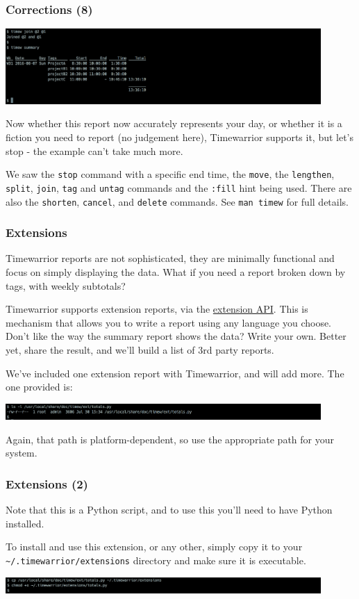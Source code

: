 \documentclass[t,handout]{beamer}
\begin{document}
\begin{frame}[fragile]\frametitle{Corrections (8)}
    \includegraphics[width=12cm]{images/tutorial43.png}

    Now whether this report now accurately represents your day, or whether it is a fiction you need to report (no judgement here), Timewarrior supports it, but let's stop - the example can't take much more.

    We saw the \verb=stop= command with a specific end time, the \verb=move=, the \verb=lengthen=, \verb=split=, \verb=join=, \verb=tag= and \verb=untag= commands and the \verb=:fill= hint being used. There are also the \verb=shorten=, \verb=cancel=, and \verb=delete= commands.  See \verb=man timew= for full details.
\end{frame}

\begin{frame}[fragile]\frametitle{Extensions}
    Timewarrior reports are not sophisticated, they are minimally functional and focus on simply displaying the data. What if you need a report broken down by tags, with weekly subtotals?

    Timewarrior supports extension reports, via the \href{https://taskwarrior.orgdocs/timewarrior/api.html}{extension API}. This is mechanism that allows you to write a report using any language you choose. Don't like the way the summary report shows the data? Write your own. Better yet, share the result, and we'll build a list of 3rd party reports.

    We've included one extension report with Timewarrior, and will add more. The one provided is:

    \includegraphics[width=12cm]{images/tutorial44.png}

    Again, that path is platform-dependent, so use the appropriate path for your system.
\end{frame}

\begin{frame}[fragile]\frametitle{Extensions (2)}
    Note that this is a Python script, and to use this you'll need to have Python installed.

    To install and use this extension, or any other, simply copy it to your \verb=~/.timewarrior/extensions= directory and make sure it is executable.

    \includegraphics[width=12cm]{images/tutorial45.png}
\end{frame}
\end{document}
